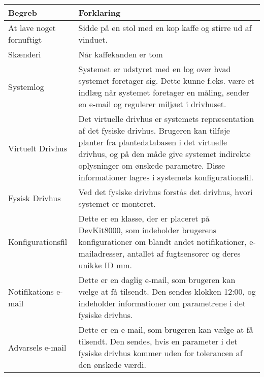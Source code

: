 \begin{table}[h]
\centering
\begin{tabularx}{/10}{| l | Z |}
\hline
\textbf{Begreb} & \textbf{Forklaring} \\\hline
	At lave noget fornuftigt & 
	Sidde på en stol med en kop kaffe og stirre ud af vinduet. \\\hline
	Skænderi &
Når kaffekanden er tom \\\hline
	Systemlog &
Systemet er udstyret med en log over hvad systemet foretager sig. Dette kunne f.eks. være et indlæg når systemet foretager en måling, sender en e-mail og regulerer miljøet i drivhuset. \\\hline
	Virtuelt Drivhus &
Det virtuelle drivhus er systemets repræsentation af det fysiske drivhus. Brugeren kan tilføje planter fra plantedatabasen i det virtuelle drivhus, og på den måde give systemet indirekte oplysninger om ønskede parametre. Disse informationer lagres i systemets konfigurationsfil. \\\hline
	Fysisk Drivhus &
Ved det fysiske drivhus forstås det drivhus, hvori systemet er monteret. \\\hline
	Konfigurationsfil &
Dette er en klasse, der er placeret på DevKit8000, som indeholder brugerens konfigurationer om blandt andet notifikationer, e-mailadresser, antallet af fugtsensorer og deres unikke ID mm. \\\hline
	Notifikations e-mail &
Dette er en daglig e-mail, som brugeren kan vælge at få tilsendt. Den sendes klokken 12:00, og indeholder informationer om parametrene i det fysiske drivhus. \\\hline
	Advarsels e-mail &
Dette er en e-mail, som brugeren kan vælge at få tilsendt. Den sendes, hvis en parameter i det fysiske drivhus kommer uden for tolerancen af den ønskede værdi. \\\hline
\end{tabularx}
\end{table}

\clearpage